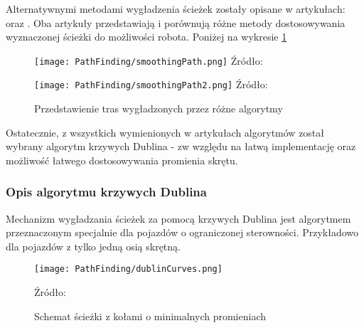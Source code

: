             Alternatywnymi metodami wygładzenia ścieżek zostały opisane w artykułach:  \cite{Compare_PathSmoothing} oraz  \cite{Compare_PathSmoothing2}.
            Oba artykuły przedstawiają i porównują różne metody dostosowywania wyznaczonej ścieżki do możliwości robota.
            Poniżej na wykresie \ref{fig:smoothingPath_res}
            \begin{figure}[!ht]
                \centering
                \begin{minipage}{0.49\textwidth}
                    \centering
                    \texttt{[image: PathFinding/smoothingPath.png]}
                    Źródło: \cite{Compare_PathSmoothing}
                \end{minipage}
                \begin{minipage}{0.49\textwidth}
                    \centering
                    \texttt{[image: PathFinding/smoothingPath2.png]}
                    Źródło: \cite{Compare_PathSmoothing2}
                \end{minipage}
                \caption{Przedstawienie tras wygładzonych przez różne algorytmy}
                \label{fig:smoothingPath_res}
            \end{figure}

            Ostatecznie, z wszystkich wymienionych w artykułach algorytmów został wybrany algorytm krzywych Dublina - zw względu na łatwą implementację oraz możliwość łatwego dostosowywania promienia skrętu.

            \subsubsection{Opis algorytmu krzywych Dublina}
                Mechanizm wygładzania ścieżek za pomocą krzywych Dublina jest algorytmem przeznaczonym specjalnie dla pojazdów o ograniczonej sterowności.
                Przykładowo dla pojazdów z tylko jedną osią skrętną.
                \begin{figure}[!ht]
                    \centering
                    \texttt{[image: PathFinding/dublinCurves.png]}
                    \caption{Schemat ścieżki z kołami o minimalnych promieniach}
                    \label{fig:dublinCurves}
                    Źródło: \cite{Compare_PathSmoothing}
                \end{figure}

